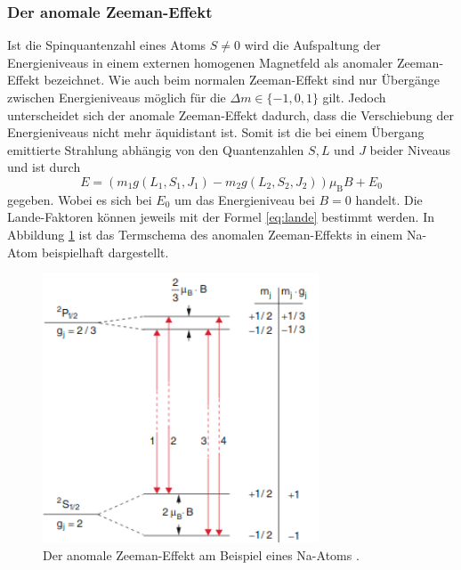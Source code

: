 \subsubsection*{Der anomale Zeeman-Effekt}
Ist die Spinquantenzahl eines Atoms $S\neq 0$ wird die Aufspaltung der Energieniveaus in einem externen homogenen Magnetfeld als anomaler Zeeman-Effekt bezeichnet. Wie auch beim normalen Zeeman-Effekt sind nur Übergänge zwischen Energieniveaus
möglich für die $\Delta m \in \{-1, 0, 1\}$ gilt. Jedoch unterscheidet sich der anomale Zeeman-Effekt dadurch, dass die Verschiebung der Energieniveaus nicht mehr äquidistant ist. Somit ist die bei einem Übergang emittierte Strahlung abhängig von 
den Quantenzahlen $S, L$ und $J$ beider Niveaus und ist durch
\begin{equation}
E=(m_1 g(L_1, S_1, J_1)-m_2g(L_2, S_2, J_2))\mu_\text{B}B + E_0
\end{equation}
gegeben. Wobei es sich bei $E_0$ um das Energieniveau bei $B=0$ handelt. Die Lande-Faktoren können jeweils mit der Formel \eqref{eq:lande} bestimmt werden. In Abbildung \ref{fig:tfig4} ist das Termschema des anomalen Zeeman-Effekts in einem Na-Atom beispielhaft
dargestellt.
\begin{figure}
\centering
\includegraphics[height=8.0cm]{anomalerzeeman.png}
\caption{Der anomale Zeeman-Effekt am Beispiel eines Na-Atoms \cite{quelle01}.}
\label{fig:tfig4}
\end{figure}

